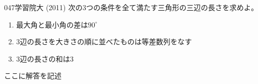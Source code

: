 \begin{thm}{047}{}{学習院大 (2011)}
 次の3つの条件を全て満たす三角形の三辺の長さを求めよ。
 \begin{enumerate}
  \renewcommand{\labelenumi}{(\alph{enumi})}
  \item 最大角と最小角の差は$90^\circ$
  \item 3辺の長さを大きさの順に並べたものは等差数列をなす
  \item 3辺の長さの和は3
 \end{enumerate}
\end{thm}

ここに解答を記述